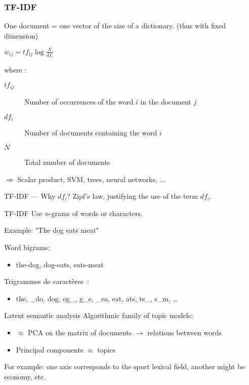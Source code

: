 \begin{frame}
  \frametitle{TF-IDF}
  One document = one vector of the size of a dictionary. (thus with fixed dimension) \\
  \begin{center}
    $\boxed{w_{ij} = tf_{ij}\log{\frac{N}{df_i}}}$
  \end{center}
  where :

  \begin{description}
    \item[$tf_{ij}$] Number of occurrences of the word $i$ in the document $j$
    \item[$df_i$] Number of documents containing the word $i$
    \item[$N$] Total number of documents
  \end{description}
  $\Rightarrow$ Scalar product, SVM, trees, neural networks, ...
\end{frame}

\begin{frame}{TF-IDF --- Why $df_i$?}
  Zipf's law, justifying the use of the term $df_i$.
\end{frame}

\begin{frame}{TF-IDF}
  Use $n$-grams of words or characters.
  \begin{center}
  Example: "The dog eats meat"
  \end{center}

  Word bigrams:

  \begin{itemize}
  \item the-dog, dog-eats, eats-meat
  \end{itemize}

  Trigrammes de caractères~:

  \begin{itemize}
  \item the, \_do, dog, og\_, g\_e, \_ea, eat, ats, ts\_, s\_m, …
  \end{itemize}
\end{frame}

\begin{frame}{Latent semantic analysis}
  Algorithmic family of topic models:

  \begin{itemize}
    \item $\approx$ PCA on the matrix of documents $\rightarrow$ relations between words
    \item Principal components $\approx$ topics
  \end{itemize}

  For example: one axis corresponds to the sport lexical field, another might be economy, etc.
\end{frame}
